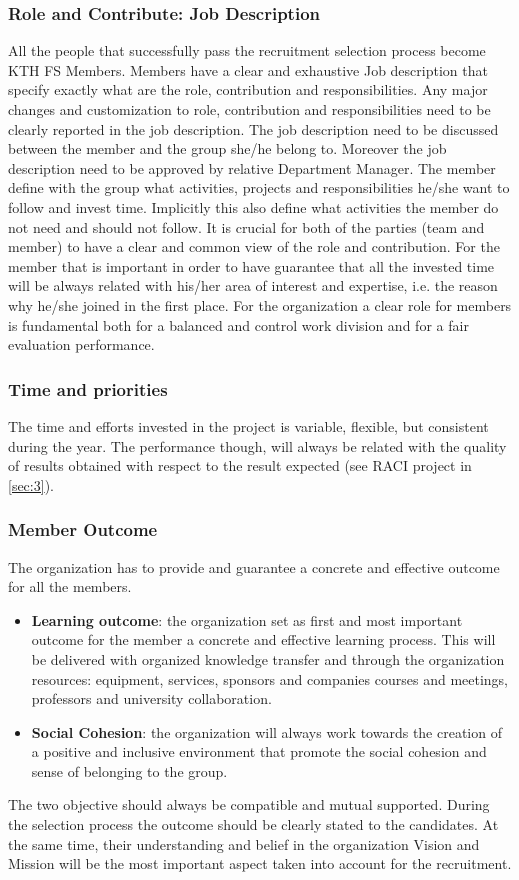 \documentclass[graybox]{svmult}
\begin{document}
\subsubsection{Role and Contribute: Job Description}
All the people that successfully pass the recruitment selection process become KTH FS Members.
Members have a clear and exhaustive Job description that specify exactly what are the role, contribution and responsibilities.
Any major changes and customization to role, contribution and responsibilities need to be clearly reported in the job description.
The job description need to be discussed between the member and the group she/he belong to. Moreover the job description need to be approved by relative Department Manager.
The member define with the group what activities, projects and responsibilities he/she want to follow and invest time. Implicitly this also define what activities the member do not need and should not follow. It is crucial for both of the parties (team and member) to have a clear and common view of the role and contribution. For the member that is important in order to have guarantee that all the invested time will be always related with his/her area of interest and expertise, i.e. the reason why he/she joined in the first place.
For the organization a clear role for members is fundamental both for a balanced and control work division and for a fair evaluation performance.
\subsubsection{Time and priorities}
The time and efforts invested in the project is variable, flexible, but consistent during the year. The performance though, will always be related with the quality of results obtained with respect to the result expected (see RACI project in \ref{sec:3}). 
\subsubsection{Member Outcome}
The organization has to provide and guarantee a concrete and effective outcome for all the members.
\begin{itemize}
    \item \textbf{Learning outcome}: the organization set as first and most important outcome for the member a concrete and effective learning process. This will be delivered with organized knowledge transfer and through the organization resources: equipment, services, sponsors and companies courses and meetings, professors and university collaboration.
    \item \textbf{Social Cohesion}: the organization will always work towards the creation of a positive and inclusive environment that promote the social cohesion and sense of belonging to the group.
\end{itemize}
The two objective should always be compatible and mutual supported.
During the selection process the outcome should be clearly stated to the candidates. At the same time, their understanding and belief in the organization Vision and Mission will be the most important aspect taken into account for the recruitment.
\end{document}

